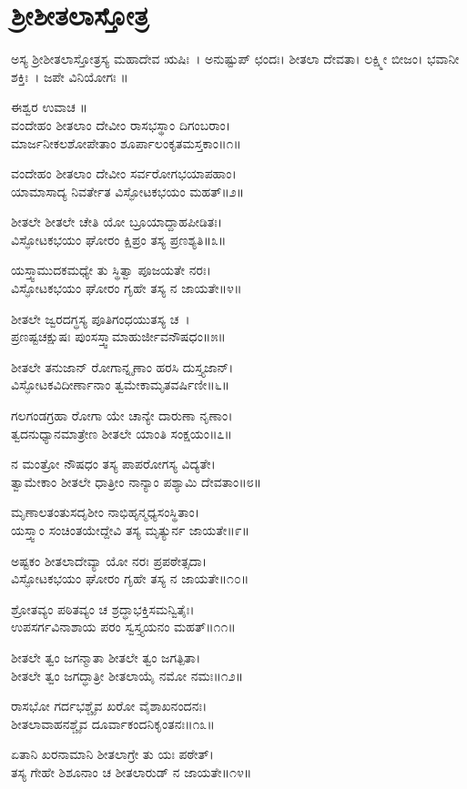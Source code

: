 \section{ಶ್ರೀಶೀತಲಾಸ್ತೋತ್ರ}
ಅಸ್ಯ ಶ್ರೀಶೀತಲಾಸ್ತೋತ್ರಸ್ಯ ಮಹಾದೇವ ಋಷಿಃ~। ಅನುಷ್ಟುಪ್ ಛಂದಃ। ಶೀತಲಾ ದೇವತಾ। ಲಕ್ಷ್ಮೀ ಬೀಜಂ। ಭವಾನೀ ಶಕ್ತಿಃ~। ಜಪೇ ವಿನಿಯೋಗಃ ॥

ಈಶ್ವರ ಉವಾಚ ॥\\
ವಂದೇಹಂ ಶೀತಲಾಂ ದೇವೀಂ ರಾಸಭಸ್ಥಾಂ ದಿಗಂಬರಾಂ।\\
ಮಾರ್ಜನೀಕಲಶೋಪೇತಾಂ ಶೂರ್ಪಾಲಂಕೃತಮಸ್ತಕಾಂ॥೧॥

ವಂದೇಹಂ ಶೀತಲಾಂ ದೇವೀಂ ಸರ್ವರೋಗಭಯಾಪಹಾಂ।\\
ಯಾಮಾಸಾದ್ಯ ನಿವರ್ತೇತ ವಿಸ್ಫೋಟಕಭಯಂ ಮಹತ್॥೨॥

ಶೀತಲೇ ಶೀತಲೇ ಚೇತಿ ಯೋ ಬ್ರೂಯಾದ್ದಾಹಪೀಡಿತಃ।\\
ವಿಸ್ಫೋಟಕಭಯಂ ಘೋರಂ ಕ್ಷಿಪ್ರಂ ತಸ್ಯ ಪ್ರಣಶ್ಯತಿ॥೩॥

ಯಸ್ತ್ವಾಮುದಕಮಧ್ಯೇ ತು ಸ್ಥಿತ್ವಾ ಪೂಜಯತೇ ನರಃ।\\
ವಿಸ್ಫೋಟಕಭಯಂ ಘೋರಂ ಗೃಹೇ ತಸ್ಯ ನ ಜಾಯತೇ॥೪॥

ಶೀತಲೇ ಜ್ವರದಗ್ಧಸ್ಯ ಪೂತಿಗಂಧಯುತಸ್ಯ ಚ~।\\
ಪ್ರಣಷ್ಟಚಕ್ಷುಷಃ ಪುಂಸಸ್ತ್ವಾಮಾಹುರ್ಜೀವನೌಷಧಂ॥೫॥

ಶೀತಲೇ ತನುಜಾನ್ ರೋಗಾನ್ನೃಣಾಂ ಹರಸಿ ದುಸ್ತ್ಯಜಾನ್।\\
ವಿಸ್ಫೋಟಕವಿದೀರ್ಣಾನಾಂ ತ್ವಮೇಕಾಮೃತವರ್ಷಿಣೀ॥೬॥

ಗಲಗಂಡಗ್ರಹಾ ರೋಗಾ ಯೇ ಚಾನ್ಯೇ ದಾರುಣಾ ನೃಣಾಂ।\\
ತ್ವದನುಧ್ಯಾನಮಾತ್ರೇಣ ಶೀತಲೇ ಯಾಂತಿ ಸಂಕ್ಷಯಂ॥೭॥

ನ ಮಂತ್ರೋ ನೌಷಧಂ ತಸ್ಯ ಪಾಪರೋಗಸ್ಯ ವಿದ್ಯತೇ।\\
ತ್ವಾಮೇಕಾಂ ಶೀತಲೇ ಧಾತ್ರೀಂ ನಾನ್ಯಾಂ ಪಶ್ಯಾಮಿ ದೇವತಾಂ॥೮॥

ಮೃಣಾಲತಂತುಸದೃಶೀಂ ನಾಭಿಹೃನ್ಮಧ್ಯಸಂಸ್ಥಿತಾಂ।\\
ಯಸ್ತ್ವಾಂ ಸಂಚಿಂತಯೇದ್ದೇವಿ ತಸ್ಯ ಮೃತ್ಯುರ್ನ ಜಾಯತೇ॥೯॥

ಅಷ್ಟಕಂ ಶೀತಲಾದೇವ್ಯಾ ಯೋ ನರಃ ಪ್ರಪಠೇತ್ಸದಾ।\\
ವಿಸ್ಫೋಟಕಭಯಂ ಘೋರಂ ಗೃಹೇ ತಸ್ಯ ನ ಜಾಯತೇ॥೧೦॥

ಶ್ರೋತವ್ಯಂ ಪಠಿತವ್ಯಂ ಚ ಶ್ರದ್ಧಾಭಕ್ತಿಸಮನ್ವಿತೈಃ।\\
ಉಪಸರ್ಗವಿನಾಶಾಯ ಪರಂ ಸ್ವಸ್ತ್ಯಯನಂ ಮಹತ್॥೧೧॥

ಶೀತಲೇ ತ್ವಂ ಜಗನ್ಮಾತಾ ಶೀತಲೇ ತ್ವಂ ಜಗತ್ಪಿತಾ।\\
ಶೀತಲೇ ತ್ವಂ ಜಗದ್ಧಾತ್ರೀ ಶೀತಲಾಯೈ ನಮೋ ನಮಃ॥೧೨॥

ರಾಸಭೋ ಗರ್ದಭಶ್ಚೈವ ಖರೋ ವೈಶಾಖನಂದನಃ।\\
ಶೀತಲಾವಾಹನಶ್ಚೈವ ದೂರ್ವಾಕಂದನಿಕೃಂತನಃ॥೧೩॥

ಏತಾನಿ ಖರನಾಮಾನಿ ಶೀತಲಾಗ್ರೇ ತು ಯಃ ಪಠೇತ್।\\
ತಸ್ಯ ಗೇಹೇ ಶಿಶೂನಾಂ ಚ ಶೀತಲಾರುಡ್ ನ ಜಾಯತೇ॥೧೪॥

